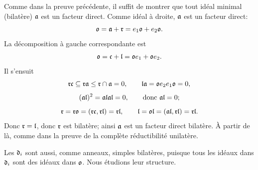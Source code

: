 Comme dans la preuve précédente, il suffit de montrer que tout idéal minimal (bilatère) $\ma$ est un facteur direct. Comme idéal à droite, $\ma$ est un facteur direct:
\[
        \mo=\ma+\mr=e_1\mo+e_2\mo.
\]
La décomposition à gauche correspondante est
\[
        \mo=\mc+\ml=\mo e_1+\mo e_2.
\]
Il s'ensuit
\[
        \mr\mc\subseteq \mr\ma\leq \mr\cap\ma=0,
        \qquad
        \ml\ma=\mo e_2e_1\mo=0,
\]
\[
        (\ma\ml)^2=\ma\ml\ma\ml=0,
        \qquad \hbox{donc } \ma\ml=0;
\]
\[
        \mr=\mr\mo=(\mr\mc,\mr\ml)=\mr\ml,
        \qquad
        \ml=\mo\ml=(\ma\ml,\mr\ml)=\mr\ml.
\]
Donc $\mr=\ml$, donc $\mr$ est bilatère; ainsi $\ma$ est un facteur direct bilatère. À partir de là, comme dans la preuve de la complète réductibilité unilatère.

Les $\md_i$ sont aussi, comme anneaux, simples bilatères, puisque tous les idéaux dans $\md_i$ sont des idéaux dans $\mo$. Nous étudions leur structure.
